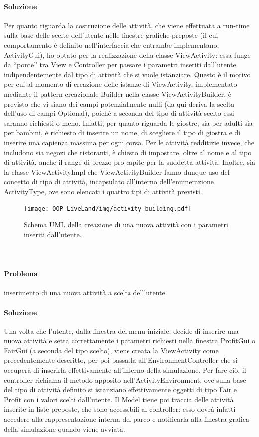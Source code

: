 \documentclass[a4paper,12pt]{report}
\begin{document}
\paragraph{Soluzione} Per quanto riguarda la costruzione delle attività, che viene effettuata a run-time sulla base delle scelte dell’utente nelle finestre grafiche preposte (il cui comportamento è definito nell’interfaccia che entrambe implementano, ActivityGui), ho optato per la realizzazione della classe ViewActivity: essa funge da “ponte” tra View e Controller per passare i parametri inseriti dall’utente indipendentemente dal tipo di attività che si vuole istanziare. Questo è il motivo per cui al momento di creazione delle istanze di ViewActivity, implementato mediante il pattern creazionale Builder nella classe ViewActivityBuilder, è previsto che vi siano dei campi potenzialmente nulli (da qui deriva la scelta dell’uso di campi Optional), poiché a seconda del tipo di attività scelto essi saranno richiesti o meno. Infatti, per quanto riguarda le giostre, sia per adulti sia per bambini, è richiesto di inserire un nome, di scegliere il tipo di giostra e di inserire una capienza massima per ogni corsa. Per le attività redditizie invece, che includono sia negozi che ristoranti, è chiesto di impostare, oltre al nome e al tipo di attività, anche il range di prezzo pro capite per la suddetta attività. Inoltre, sia la classe ViewActivityImpl che ViewActivityBuilder fanno dunque uso del concetto di tipo di attività, incapsulato all’interno dell’enumerazione ActivityType, ove sono elencati i quattro tipi di attività previsti.

\begin{figure}[h]
\centering{}
\texttt{[image: OOP-LiveLand/img/activity\_building.pdf]}
\caption{Schema UML della creazione di una nuova attività con i parametri inseriti dall'utente.}
\label{img:activity_building}
\end{figure}

\paragraph{\\\\Problema} inserimento di una nuova attività a scelta dell'utente.
\paragraph{Soluzione} Una volta che l’utente, dalla finestra del menu iniziale, decide di inserire una nuova attività e setta correttamente i parametri richiesti nella finestra ProfitGui o FairGui (a seconda del tipo scelto), viene creata la ViewActivity come precedentemente descritto, per poi passarla all’EnvironmentController che si occuperà di inserirla effettivamente all’interno della simulazione. Per fare ciò, il controller richiama il metodo apposito nell’ActivityEnvironment, ove sulla base del tipo di attività definito si istanziano effettivamente oggetti di tipo Fair e Profit con i valori scelti dall’utente. Il Model tiene poi traccia delle attività inserite in liste preposte, che sono accessibili al controller: esso dovrà infatti accedere alla rappresentazione interna del parco e notificarla alla finestra grafica della simulazione quando viene avviata.
\end{document}
